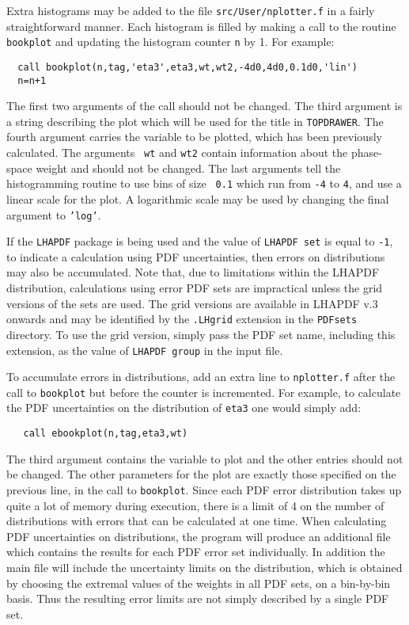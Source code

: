 \documentclass[12pt]{article}
\begin{document}
Extra histograms may be added to the file {\tt src/User/nplotter.f} in
a fairly straightforward manner. Each histogram is filled by making
a call to the routine {\tt bookplot} and updating the histogram
counter {\tt n} by 1. For example:

\begin{verbatim}
  call bookplot(n,tag,'eta3',eta3,wt,wt2,-4d0,4d0,0.1d0,'lin')
  n=n+1
\end{verbatim}
The first two arguments of the call should not be changed. The third
argument is a string describing the plot which will be used for the
title in {\tt TOPDRAWER}. The fourth argument carries the variable to
be plotted, which has been previously calculated. The arguments {\tt
wt} and {\tt wt2} contain information about the phase-space weight and
should not be changed. The
last arguments tell the histogramming routine to use bins of size {\tt
0.1} which run from {\tt -4} to {\tt 4}, and use a linear scale for
the plot. A logarithmic scale may be used by changing the final
argument to {\tt 'log'}.

If the {\tt LHAPDF} package is being used and the value of
{\tt LHAPDF set} is equal to {\tt -1},  to indicate a calculation using
PDF uncertainties, then errors on distributions may also be accumulated.
Note that, due to limitations within the LHAPDF distribution, calculations
using error PDF sets are impractical unless the grid versions of the sets
are used. The grid versions are available in LHAPDF v.3 onwards and may be identified
by the {\tt .LHgrid} extension in the {\tt PDFsets} directory. To use the
grid version, simply pass the PDF set name, including this extension, as
the value of {\tt LHAPDF group} in the input file.
 
To accumulate errors in distributions, add an extra
line to {\tt nplotter.f} after the
call to {\tt bookplot} but before the counter is incremented. For
example, to calculate the PDF uncertainties on the distribution
of {\tt eta3} one would simply add:
\begin{verbatim}
   call ebookplot(n,tag,eta3,wt)
\end{verbatim}
The third argument contains the variable to plot and the other entries
should not be changed. The other parameters for the plot are exactly
those specified on the previous line, in the call to {\tt bookplot}.
Since each PDF error distribution takes up quite a lot of memory
during execution, there is a limit of 4 on the number of distributions
with errors that can be calculated at one time. When calculating
PDF uncertainties on distributions, the program will produce an
additional file which contains the results for each PDF error set
individually. In addition the main file will include the uncertainty
limits on the distribution, which is obtained by choosing the extremal
values of the weights in all PDF sets, on a bin-by-bin basis. Thus
the resulting error limits are not simply described by a single PDF
set.
\end{document}
